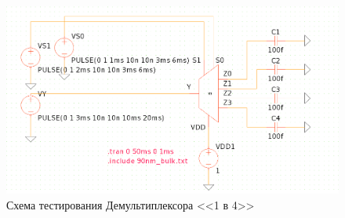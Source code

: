 \begin{figure}[H]
	\centering
	\includegraphics[width=1\textwidth]{../data/boe-testing}
	\caption{Схема тестирования Демультиплексора <<1 в 4>>}
\end{figure}
